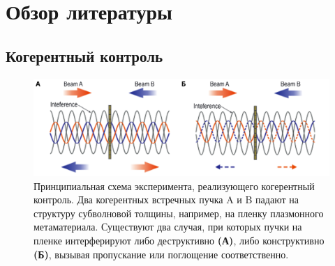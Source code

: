 \chapter{Обзор литературы}

\section{Когерентный контроль}

\begin{figure}[b!]
    \begin{center}
        \includegraphics[width=\textwidth]{pictures/Coherent_Control.png}
        \caption{Принципиальная схема эксперимента, реализующего когерентный контроль. Два когерентных встречных пучка A и B падают на структуру субволновой толщины, например, на пленку плазмонного метаматериала. Существуют два случая, при которых пучки на пленке интерферируют либо деструктивно \textbf{(А)}, либо конструктивно \textbf{(Б)}, вызывая пропускание или поглощение соответственно\cite{lightWithLight2012}.}
        \label{fig:coherentControl}
    \end{center}
\end{figure}

